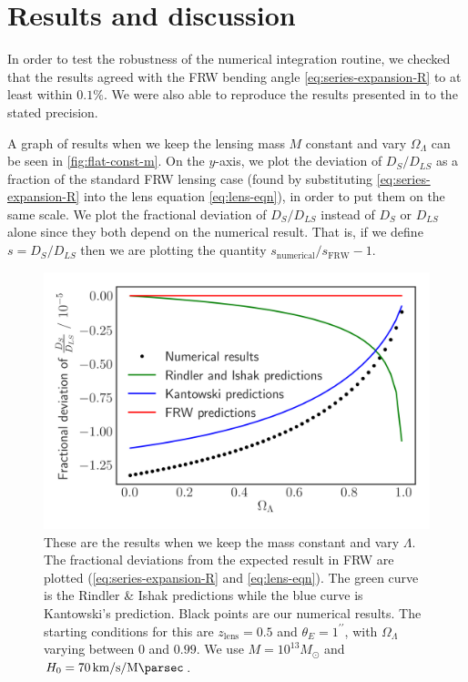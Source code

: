 \chapter{Results and discussion}
\label{chapter:results}

In order to test the robustness of the numerical integration routine, we checked that the results agreed with the FRW bending angle \autoref{eq:series-expansion-R} to at least within $0.1\%$. We were also able to reproduce the results presented in \citet{schucker2009strong} to the stated precision. 

A graph of results when we keep the lensing mass $M$ constant and vary $\Omega_{\Lambda}$ can be seen in \autoref{fig:flat-const-m}. On the $y$-axis, we plot the deviation of $D_{S}/D_{LS}$ as a fraction of the standard FRW lensing case (found by substituting \autoref{eq:series-expansion-R} into the lens equation \ref{eq:lens-eqn}), in order to put them on the same scale. We plot the fractional deviation of $D_{S}/D_{LS}$ instead of $D_S$ or $D_{LS}$ alone since they both depend on the numerical result. That is, if we define $s = D_{S}/D_{LS}$ then we are plotting the quantity $s_{\text{numerical}} / s_{\text{FRW}} - 1$. 

\begin{figure}
  \centering
  \includegraphics[height=0.5\linewidth]{images/flat.png}
  \caption{These are the results when we keep the mass constant and vary $\Lambda$. The fractional deviations from the expected result in FRW are plotted (\autoref{eq:series-expansion-R} and \autoref{eq:lens-eqn}). The green curve is the Rindler \& Ishak predictions while the blue curve is Kantowski's prediction. Black points are our numerical results. The starting conditions for this are $z_{\text{lens}} = 0.5$ and $\theta_E = 1^{\prime\prime}$, with $\Omega_{\Lambda}$ varying between $0$ and $0.99$. We use $M = 10^{13}M_{\odot}$ and $H_0 = \SI{70}{\kilo\meter\per\second\per\mega\parsec}$.}
  \label{fig:flat-const-m}
\end{figure}

